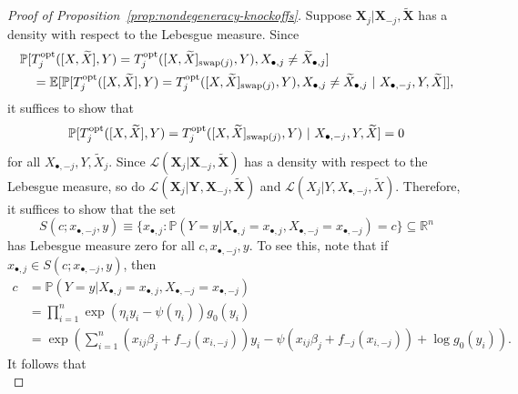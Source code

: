 \documentclass[12pt]{article}
\theoremstyle{definition}
\theoremstyle{remark}
\newcommand{\prx}{\bm X}
\newcommand{\srx}{X}
\newcommand{\sfx}{x}
\newcommand{\prxk}{{{\widetilde{\bm X}}}}
\newcommand{\srxk}{\widetilde X}
\newcommand{\pry}{{\bm Y}}
\newcommand{\sry}{Y}
\newcommand{\sfy}{y}
\begin{document}
\begin{proof}[Proof of Proposition~\ref{prop:nondegeneracy-knockoffs}]
	
	Suppose $\prx_{j}|\prx_{-j}, \prxk$ has a density with respect to the Lebesgue measure. Since
	\begin{equation*}
	\begin{split}
	&\mathbb P[T^{\textnormal{opt}}_j([\srx, \srxk], \sry) = T^{\textnormal{opt}}_j([\srx, \srxk]_{\textnormal{swap}(j)}, \sry), \srx_{\bullet,j} \neq \srxk_{\bullet,j}] \\
	&\quad= \mathbb E[\mathbb P[T^{\textnormal{opt}}_j([\srx, \srxk], \sry) = T^{\textnormal{opt}}_j([\srx, \srxk]_{\textnormal{swap}(j)}, \sry), \srx_{\bullet,j} \neq \srxk_{\bullet,j}\ |\ \srx_{\bullet,-j}, \sry, \srxk]],
	\end{split}
	\end{equation*}
	it suffices to show that 
	\begin{equation*}
	\mathbb P[T^{\textnormal{opt}}_j([\srx, \srxk], \sry) = T^{\textnormal{opt}}_j([\srx, \srxk]_{\textnormal{swap}(j)}, \sry)\ |\ \srx_{\bullet,-j}, \sry, \srxk] = 0
	\end{equation*}
	for all $\srx_{\bullet,-j}, \sry, \srxk_j$. Since $\mathcal L(\prx_j|\prx_{-j}, \prxk)$ has a density with respect to the Lebesgue measure, so do $\mathcal L(\prx_j|\pry, \prx_{-j}, \prxk)$ and $\mathcal L(\srx_j|\sry,  \srx_{\bullet,-j}, \srxk)$. Therefore, it suffices to show that the set
	\begin{equation*}
	S(c; \sfx_{\bullet,-j}, \sfy) \equiv \{x_{\bullet,j} : \mathbb P(\sry = \sfy|\srx_{\bullet,j} = \sfx_{\bullet,j}, \srx_{\bullet,-j} = \sfx_{\bullet,-j}) = c\} \subseteq \mathbb R^{n}
	\end{equation*}
	has Lebesgue measure zero for all $c, \sfx_{\bullet,-j}, \sfy$. To see this, note that if $\sfx_{\bullet,j} \in S(c; \sfx_{\bullet,-j}, \sfy)$, then
	\begin{equation*}
	\begin{split}
	c &= \mathbb P(\sry = \sfy|\srx_{\bullet,j} = \sfx_{\bullet,j}, \srx_{\bullet,-j} = \sfx_{\bullet,-j})\\
	&= \prod_{i = 1}^n \exp(\eta_i \sfy_i - \psi(\eta_i))g_0(\sfy_i) \\
	&= \exp\left(\sum_{i = 1}^n (x_{ij}\beta_j  + f_{-j}(\sfx_{i,-j}))\sfy_i - \psi(\sfx_{ij}\beta_j  + f_{-j}(\sfx_{i,-j})) + \log g_0(\sfy_i) \right).
	\end{split}
	\end{equation*}
	It follows that
	\begin{equation}

\end{equation}
\end{proof}
\end{document}
